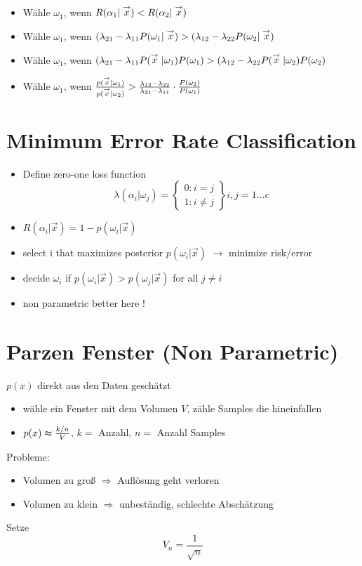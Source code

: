 \begin{itemize}
\item Wähle $\omega_1$, wenn $R(\alpha_1 | \stackrel{\to}{x}) < R(\alpha_2 | \stackrel{\to}{x})$
\item Wähle $\omega_1$, wenn $(\lambda_{21} - \lambda_{11} P(\omega_1 | \stackrel{\to}{x}) > (\lambda_{12} - \lambda_{22} P(\omega_2 | \stackrel{\to}{x})$
\item Wähle $\omega_1$, wenn $(\lambda_{21} - \lambda_{11} P(\stackrel{\to}{x} | \omega_1)P(\omega_1) > (\lambda_{12} - \lambda_{22} P(\stackrel{\to}{x} | \omega_2) P(\omega_2)$
\item Wähle $\omega_1$, wenn $\frac{p(\stackrel{\to}{x} | \omega_1)}{p(\stackrel{\to}{x} | \omega_2)} > \frac{\lambda_{12} - \lambda_{22}}{\lambda_{21} - \lambda_{11}} \cdot \frac{P(\omega_2)}{P(\omega_1)}$
\end{itemize}


\section{Minimum Error Rate Classification}
\begin{itemize}
	\item Define zero-one loss function $$\lambda(\alpha_i|\omega_j)=\left\{
	\begin{array}{c}
		0 : i=j \\
		1 : i\neq j
	\end{array}\right\} i,j=1...c
	$$
	\item $R(\alpha_i|\vec{x})=1-p(\omega_i|\vec{x})$
	\item select i that maximizes posterior $p(\omega_i|\vec{x})$ $\to$ minimize risk/error
	\item decide $\omega_i$ if $p(\omega_i|\vec{x})>p(\omega_j|\vec{x})$ for all $j\neq i$
	\item non parametric better here !
\end{itemize}

\section{Parzen Fenster (Non Parametric)}

$p(x)$ direkt aus den Daten geschätzt
\begin{itemize}
\item wähle ein Fenster mit dem Volumen $V$, zähle Samples die hineinfallen\item $p(x) \thickapprox \frac{k/n}{V}$, $k = $ Anzahl, $n = $ Anzahl Samples
\end{itemize}
Probleme:
\begin{itemize}
\item Volumen zu groß $\Rightarrow$ Auflösung geht verloren
\item Volumen zu klein $\Rightarrow$ unbeständig, schlechte Abschätzung
\end{itemize}
Setze $$V_n = \frac{1}{\sqrt{n}}$$


